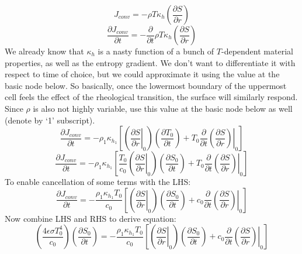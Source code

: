 \begin{equation}
J_{conv} = -\rho T \kappa_h \left( \frac{\partial S}{\partial r} \right)
\end{equation}
\begin{equation}
\frac{\partial J_{conv}}{\partial t} = - \frac{\partial}{\partial t} \rho T \kappa_h \left( \frac{\partial S}{\partial r} \right)
\end{equation}
We already know that $\kappa_h$ is a nasty function of a bunch of $T$-dependent material properties, as well as the entropy gradient.  We don't want to differentiate it with respect to time of choice, but we could approximate it using the value at the basic node below.  So basically, once the lowermost boundary of the uppermost cell feels the effect of the rheological transition, the surface will similarly respond.  Since $\rho$ is also not highly variable, use this value at the basic node below as well (denote by `1' subscript).
\begin{equation}
\frac{\partial J_{conv}}{\partial t} = - \rho_1 \kappa_{h_1} \left[ \left(\left.\frac{\partial S}{\partial r}\right|_0 \right) \left( \frac{\partial T_0}{\partial t} \right) + T_0 \frac{\partial}{\partial t} \left. \left(\frac{\partial S}{\partial r}\right) \right|_0  \right]
\end{equation}
\begin{equation}
\frac{\partial J_{conv}}{\partial t} = - \rho_1 \kappa_{h_1} \left[ \frac{T_0}{c_0} \left(\left.\frac{\partial S}{\partial r}\right|_0 \right) \left( \frac{\partial S_0}{\partial t} \right) + T_0 \frac{\partial}{\partial t} \left. \left(\frac{\partial S}{\partial r}\right) \right|_0  \right]
\end{equation}
To enable cancellation of some terms with the LHS:
\begin{equation}
\frac{\partial J_{conv}}{\partial t} = - \frac{\rho_1 \kappa_{h_1} T_0}{c_0} \left[ \left(\left.\frac{\partial S}{\partial r}\right|_0 \right) \left( \frac{\partial S_0}{\partial t} \right) + c_0 \frac{\partial}{\partial t} \left. \left(\frac{\partial S}{\partial r}\right) \right|_0  \right]
\end{equation}
Now combine LHS and RHS to derive equation:
\begin{equation}
\left( \frac{4 \epsilon \sigma T_0^4}{c_0} \right) \left(\frac{\partial S_0}{\partial t} \right) = - \frac{\rho_1 \kappa_{h_1} T_0}{c_0} \left[ \left(\left.\frac{\partial S}{\partial r}\right|_0 \right) \left( \frac{\partial S_0}{\partial t} \right) + c_0 \frac{\partial}{\partial t} \left. \left(\frac{\partial S}{\partial r}\right) \right|_0  \right]
\end{equation}

